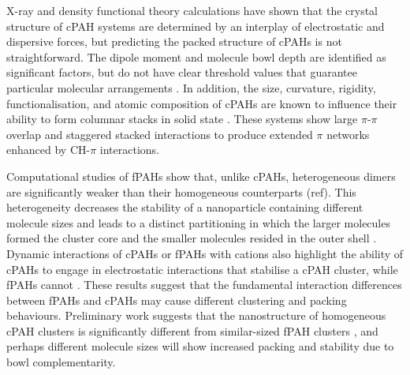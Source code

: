 X-ray and density functional theory calculations have shown that the crystal structure of cPAH systems are determined by an interplay of electrostatic and dispersive forces, but predicting the packed structure of cPAHs is not straightforward. The dipole moment and molecule bowl depth are identified as significant factors, but do not have clear threshold values that guarantee particular molecular arrangements \cite{Filatov2010}. In addition, the size, curvature, rigidity, functionalisation, and atomic composition of cPAHs are known to influence their ability to form columnar stacks in solid state \cite{wang2015electronic,scott1999geodesic,grabowsky2010electron,sygula1994bowl,bronstein2002practical,forkey1997crystallographic,roch2017indenocorannulene,petrukhina2004hemibuckminsterfullerene,petrukhina2005unprecedented,Filatov2010,sakurai2005structural,imamura1999triphenyleno,wu2006aromatic,sanyal2014functional}. These systems show large $\pi$-$\pi$ overlap and staggered stacked interactions to produce extended $\pi$ networks enhanced by CH-$\pi$ interactions.

Computational studies of fPAHs show that, unlike cPAHs, heterogeneous dimers are significantly weaker than their homogeneous counterparts (ref). This heterogeneity decreases the stability of a nanoparticle containing different molecule sizes and leads to a distinct partitioning in which the larger molecules formed the cluster core and the smaller molecules resided in the outer shell \cite{bowal2018partitioning}. Dynamic interactions of cPAHs or fPAHs with cations also highlight the ability of cPAHs to engage in electrostatic interactions that stabilise a cPAH cluster, while fPAHs cannot \cite{bowal2019ion}. These results suggest that the fundamental interaction differences between fPAHs and cPAHs may cause different clustering and packing behaviours. Preliminary work suggests that the nanostructure of homogeneous cPAH clusters is significantly different from similar-sized fPAH clusters \cite{bowal2019ion}, and perhaps different molecule sizes will show increased packing and stability due to bowl complementarity.

